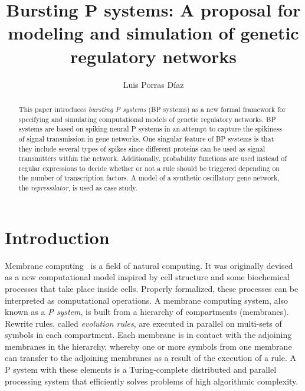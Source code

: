 \documentclass[runningheads,a4paper]{llncs}
\begin{document}
\mainmatter              %
%
\title{Bursting P systems: A proposal for modeling and simulation of genetic regulatory networks}
%
%
\author{Luis Porras D\'iaz}
%
%
%
%

%

\maketitle              %

\begin{abstract}
This paper introduces \emph{bursting P systems} (BP systems) as a new formal framework for specifying and simulating computational models of genetic regulatory networks. BP systems are based on spiking neural P systems in an attempt to capture the spikiness of signal transmission in gene networks. One singular feature of BP systems is that they include several types of spikes since different proteins can be used as signal transmitters within the network. Additionally, probability functions are used instead of regular expressions to decide whether or not a rule should be triggered depending on the number of transcription factors. A model of a synthetic oscillatory gene network, the \textit{repressilator}, is used as case study.
\end{abstract}
%
\section{Introduction}
Membrane computing~\cite{Paun2000} is a field of natural computing. It was originally devised as a new computational model inspired by cell structure and some biochemical processes that take place inside cells. Properly formalized, these processes can be interpreted as computational operations. A membrane computing system, also known as a \emph{P system}, is built from a hierarchy of compartments (membranes). Rewrite rules, called \emph{evolution rules}, are executed in parallel on multi-sets of symbols in each compartment. Each membrane is in contact with the adjoining membranes in the hierarchy, whereby one or more symbols from one membrane can transfer to the adjoining membranes as a result of the execution of a rule. A P system with these elements is a Turing-complete distributed and parallel processing system that efficiently solves problems of high algorithmic complexity.
\end{document}
